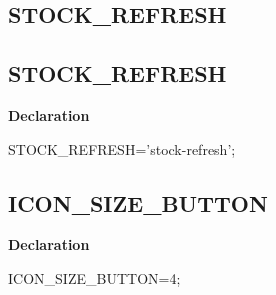\documentclass{report}
\newif\ifpdf
\begin{document}
\subsection*{\large{\textbf{STOCK{\_}REFRESH}}\normalsize\hspace{1ex}\hrulefill}
\else
\subsection*{STOCK{\_}REFRESH}
\fi
\label{common-STOCK_REFRESH}
\begin{list}{}{
\setlength{\itemindent}{0cm}
\setlength{\listparindent}{0cm}
\setlength{\leftmargin}{\evensidemargin}
\addtolength{\leftmargin}{\tmplength}
\settowidth{\labelsep}{X}
\addtolength{\leftmargin}{\labelsep}
\setlength{\labelwidth}{\tmplength}
}
\item[\textbf{Declaration}\hfill]
\ifpdf
\begin{flushleft}
\fi
\begin{ttfamily}
STOCK{\_}REFRESH='stock-refresh';\end{ttfamily}

\ifpdf
\end{flushleft}
\fi

\end{list}
\ifpdf
\subsection*{\large{\textbf{ICON{\_}SIZE{\_}BUTTON}}\normalsize\hspace{1ex}\hrulefill}
\else
\subsection*{ICON{\_}SIZE{\_}BUTTON}
\fi
\label{common-ICON_SIZE_BUTTON}
\begin{list}{}{
\setlength{\itemindent}{0cm}
\setlength{\listparindent}{0cm}
\setlength{\leftmargin}{\evensidemargin}
\addtolength{\leftmargin}{\tmplength}
\settowidth{\labelsep}{X}
\addtolength{\leftmargin}{\labelsep}
\setlength{\labelwidth}{\tmplength}
}
\item[\textbf{Declaration}\hfill]
\ifpdf
\begin{flushleft}
\fi
\begin{ttfamily}
ICON{\_}SIZE{\_}BUTTON=4;\end{ttfamily}

\ifpdf
\end{flushleft}
\fi

\end{list}
\ifpdf
\end{document}
